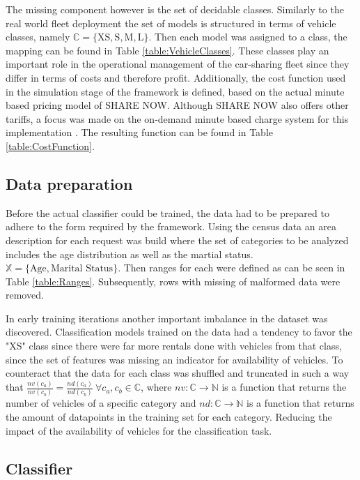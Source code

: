 The missing component however is the set of decidable classes. Similarly to the real world fleet deployment the
set of models is structured in terms of vehicle classes, namely $\mathbb{C} = \{ \text{XS}, \text{S}, \text{M}, \text{L} \}$.
Then each model was assigned to a class, the mapping can be found in Table \ref{table:VehicleClasses}.
These classes play an important role in the operational management of the car-sharing fleet since they differ in terms of costs and therefore profit.
 Additionally,  the cost function used in the simulation stage
of the framework is defined, based on the actual minute based pricing model of SHARE NOW. Although SHARE NOW also offers other tariffs, a focus was made on
the on-demand minute based charge system for this implementation \cite{ShareNowPricing}. The resulting function can be found in Table \ref{table:CostFunction}.

\subsection{Data preparation}
\label{sub_sec:CaseStudy/Preparation}

Before the actual classifier could be trained, the data had to be prepared to adhere to the form
required by the framework. Using the census data an area description for each request was
build where the set of categories to be analyzed includes the age distribution as well as the martial status.
$\mathbb{X} = \{ \text{Age}, \text{Marital Status} \}$. Then ranges for each were defined as can be seen in Table \ref{table:Ranges}.
Subsequently, rows with missing of malformed data were removed.

In early training iterations another important imbalance in the dataset was discovered. Classification models
trained on the data had a tendency to favor the "XS" class since there were far more rentals done with
vehicles from that class, since the set of features was missing an indicator for availability
of vehicles. To counteract that the data for each class was shuffled and truncated in such a way that
$\frac{nv(c_a)}{nv(c_b)} = \frac{nd(c_a)}{nd(c_b)} \ \forall c_a, c_b \in \mathbb{C}$, where $nv: \mathbb{C} \to \mathbb{N}$ is a function
that returns the number of vehicles of a specific category and $nd: \mathbb{C} \to \mathbb{N}$ is a function that returns the
amount of datapoints in the training set for each category. Reducing the impact of the availability of vehicles for
the classification task.

\subsection{Classifier}
\label{sub_sec:CaseStudy/Classifier}

